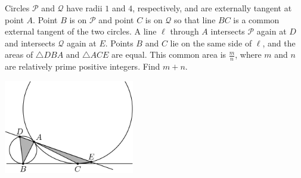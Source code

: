 Circles $\mathcal{P}$ and $\mathcal{Q}$ have radii $1$ and $4$, respectively, and are externally tangent at point $A$. Point $B$ is on $\mathcal{P}$ and point $C$ is on $\mathcal{Q}$ so that line $BC$ is a common external tangent of the two circles. A line $\ell$ through $A$ intersects $\mathcal{P}$ again at $D$ and intersects $\mathcal{Q}$ again at $E$. Points $B$ and $C$ lie on the same side of $\ell$, and the areas of $\triangle DBA$ and $\triangle ACE$ are equal. This common area is $\frac{m}{n}$, where $m$ and $n$ are relatively prime positive integers. Find $m+n$.

\begin{center}
\includegraphics[width = 57.0mm]{img/fig0.png}
\end{center}